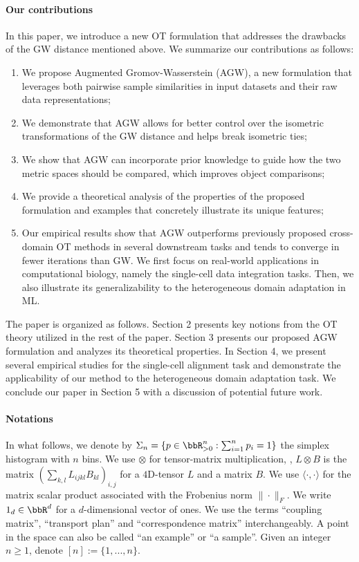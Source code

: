 \paragraph{Our contributions}
In this paper, we introduce a new OT formulation that addresses the drawbacks of the
GW distance mentioned above. We summarize our contributions as follows:
\begin{enumerate}
    \item We propose Augmented Gromov-Wasserstein (AGW), a new formulation that leverages
    both pairwise sample similarities in input datasets and their raw data representations;
    \item We demonstrate that AGW allows for better control over the isometric transformations
    of the GW distance and helps break isometric ties;
    \item We show that AGW can incorporate prior knowledge to guide how the two metric spaces
    should be compared, which improves object comparisons; %
    \item We provide a theoretical analysis of the properties of the proposed formulation
    and examples that concretely illustrate its unique features;
    \item Our empirical results show that AGW outperforms previously proposed
    cross-domain OT methods in several downstream tasks and tends to converge in fewer iterations
    than GW. We first focus on real-world applications in computational biology,
    namely the single-cell data integration tasks. Then, we also illustrate its generalizability
    to the heterogeneous domain adaptation in ML.
\end{enumerate}
The paper is organized as follows. Section 2 presents key notions from the OT theory
utilized in the rest of the paper. Section 3 presents our proposed AGW formulation and
analyzes its theoretical properties. In Section 4, we present several empirical studies
for the single-cell alignment task and demonstrate the applicability of our method to
the heterogeneous domain adaptation task. We conclude our paper in Section 5 with
a discussion of potential future work.

\paragraph{Notations} In what follows, we denote by
$\Sigma_{n}=\{ p \in \bbR_{> 0}^n: \sum_{i=1}^{n} p_{i}=1\}$
the simplex histogram with $n$ bins. We use $\otimes$ for tensor-matrix multiplication,
\ie, $L \otimes B$ is the matrix $(\sum_{k,l} L_{ijkl} B_{kl})_{i,j}$ for a $4$D-tensor $L$ and
a matrix $B$. We use $\langle \cdot, \cdot \rangle$ for the matrix scalar product associated with
the Frobenius norm $\|\cdot\|_{F}$. We write $1_d \in \bbR^d$ for a
$d$-dimensional vector of ones. We use the terms ``coupling matrix'', ``transport plan''
and ``correspondence matrix'' interchangeably.
A point in the space can also be called ``an example'' or ``a sample''.
Given an integer $n \geq 1$, denote $[n] := \{ 1, ..., n\}$.

